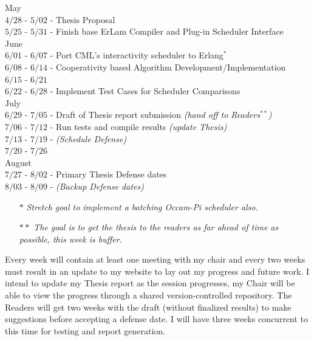     May\\
    	$4/28$ - $5/02$ - Thesis Proposal\\
        $5/25$ - $5/31$ - Finish base ErLam Compiler and Plug-in Scheduler Interface \\

    June \\
        $6/01$ - $6/07$ - Port CML's interactivity scheduler to Erlang$^*$\\
        $6/08$ - $6/14$ - Cooperativity based Algorithm Development/Implementation \\
        $6/15$ - $6/21$ \\
        $6/22$ - $6/28$ - Implement Test Cases for Scheduler Comparisons\\

    July\\
        $6/29$ - $7/05$ - Draft of Thesis report submission {\em (hand off to Readers$^{**}$)} \\
        $7/06$ - $7/12$ - Run tests and compile results {\em (update Thesis)} \\
        $7/13$ - $7/19$ - {\em(Schedule Defense)}\\
        $7/20$ - $7/26$ \\

    August\\
        $7/27$ - $8/02$ - Primary Thesis Defense dates\\
        $8/03$ - $8/09$ - {\em(Backup Defense dates)}

\begin{itemize}
\setlength{\itemsep}{1pt}
\setlength{\parskip}{0pt}
\setlength{\parsep}{0pt}
\item[$*$]{\small\em Stretch goal to implement a batching Occam-Pi scheduler also.}
\item[$**$]{\small\em The goal is to get the thesis to the readers as far ahead of time as possible, this week is buffer.}
\end{itemize}

Every week will contain at least one meeting with my chair and every two weeks
must result in an update to my website to lay out my progress and future work. 
I intend to update my Thesis report as the session progresses, my Chair will be 
able to view the progress through a shared version-controlled repository. The
Readers will get two weeks with the draft (without finalized results) to make
suggestions before accepting a defense date. I will have three weeks concurrent
to this time for testing and report generation.\\

